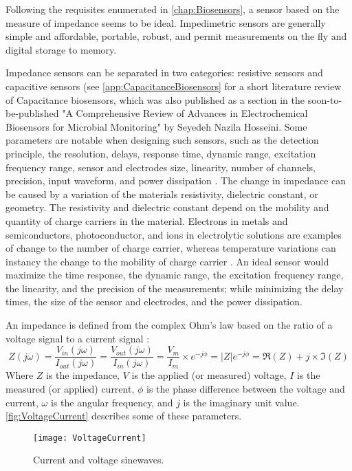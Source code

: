 Following the requisites enumerated in \autoref{chap:Biosensors}, a sensor based on the measure of impedance seems to be ideal. Impedimetric sensors are generally simple and affordable, portable, robust, and permit measurements on the fly and digital storage to memory. \par

Impedance sensors can be separated in two categories: resistive sensors and capacitive sensors (see \autoref{app:CapacitanceBiosensors} for a short literature review of Capacitance biosensors, which was also published as a section in the soon-to-be-published "A Comprehensive Review of Advances in Electrochemical Biosensors for Microbial Monitoring" by Seyedeh Nazila Hosseini. Some parameters are notable when designing such sensors, such as the detection principle, the resolution, delays, response time, dynamic range, excitation frequency range, sensor and electrodes size, linearity, number of channels, precision, input waveform, and power dissipation \cite{Carminati2017}. The change in impedance can be caused by a variation of the materials resistivity, dielectric constant, or geometry. The resistivity and dielectric constant depend on the mobility and quantity of charge carriers in the material. Electrons in metals and semiconductors, photoconductor, and ions in electrolytic solutions are examples of change to the number of charge carrier, whereas temperature variations can instancy the change to the mobility of charge carrier \cite{Carminati2017}. An ideal sensor would maximize the time response, the dynamic range, the excitation frequency range, the linearity, and the precision of the measurements; while minimizing the delay times, the size of the sensor and electrodes, and the power dissipation. \par

An impedance is defined from the complex Ohm's law \cite{leHuy2004circuits} based on the ratio of a voltage signal to a current signal : 
\begin{equation}
   Z(j\omega) = \frac{V_{in}(j\omega)}{I_{out}(j\omega)} = \frac{V_{out}(j\omega)}{I_{in}(j\omega)} = \frac{V_m}{I_m} \times e^{-j\phi} = \lvert Z \rvert e^{-j\phi} = \Re(Z) +j \times \Im(Z)
   \label{eq:ImpedanceEIS}
\end{equation}
Where $Z$ is the impedance, $V$ is the applied (or measured) voltage, $I$ is the measured (or applied) current, $\phi$ is the phase difference between the voltage and current, $\omega$ is the angular frequency, and $j$ is the imaginary unit value. \autoref{fig:VoltageCurrent} describes some of these parameters. \par
\begin{figure}[h]
    \centering
    \texttt{[image: VoltageCurrent]}
    \caption{Current and voltage sinewaves.}
    \label{fig:VoltageCurrent}
\end{figure}

